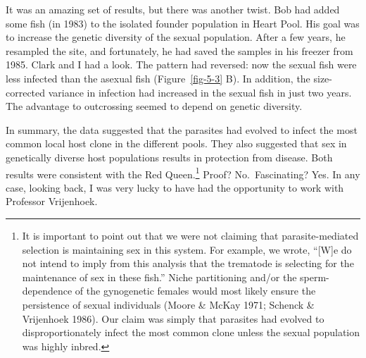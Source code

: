 \documentclass[
  letterpaper,
]{book}
\begin{document}
It was an amazing set of results, but there was another twist. Bob had
added some fish (in 1983) to the isolated founder population in Heart
Pool. His goal was to increase the genetic diversity of the sexual
population. After a few years, he resampled the site, and fortunately,
he had saved the samples in his freezer from 1985. Clark and I had a
look. The pattern had reversed: now the sexual fish were less infected
than the asexual fish (Figure~\ref{fig-5-3} B). In addition, the
size-corrected variance in infection had increased in the sexual fish in
just two years. The advantage to outcrossing seemed to depend on genetic
diversity.

In summary, the data suggested that the parasites had evolved to infect
the most common local host clone in the different pools. They also
suggested that sex in genetically diverse host populations results in
protection from disease. Both results were consistent with the Red
Queen.\footnote{It is important to point out that we were not claiming
  that parasite-mediated selection is maintaining sex in this system.
  For example, we wrote, ``{[}W{]}e do not intend to imply from this
  analysis that the trematode is selecting for the maintenance of sex in
  these fish.'' Niche partitioning and/or the sperm-dependence of the
  gynogenetic females would most likely ensure the persistence of sexual
  individuals (Moore \& McKay 1971; Schenck \& Vrijenhoek 1986). Our
  claim was simply that parasites had evolved to disproportionately
  infect the most common clone unless the sexual population was highly
  inbred.} Proof? No.~Fascinating? Yes. In any case, looking back, I was
very lucky to have had the opportunity to work with Professor
Vrijenhoek.
\end{document}
